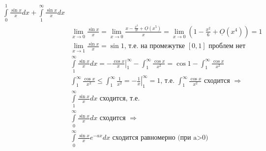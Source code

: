 \documentclass[a4paper, 12pt]{article}
\begin{document}
\begin{enumerate}
\begin{align*}
 \int\limits_0^1 \frac{\sin x}{x}dx + \int\limits_1^\infty \frac{\sin x}{x}dx \\
 &\lim_{x\to0}\frac{\sin x}{x} = \lim_{x\to0}\frac{x-\frac{x^3}{3!}+\underline{O}(x^5)}{x} = \lim_{x\to0}(1-\frac{x^2}{6}+\underline{O}(x^4)) = 1 \\
 &\lim_{x\to1}\frac{\sin x}{x} = \sin 1 \text{, т.е. на промежутке $[0,1]$ проблем нет} \\
 &\int\limits_1^\infty \frac{\sin x}{x}dx = 
 \left.-\frac{\cos x}{x}\right|_1^\infty - \int_1^\infty \frac{\cos x}{x^2} = 
 \cos 1 - \int_1^\infty \frac{\cos x}{x^2} \\
 &\int_1^\infty \frac{\cos x}{x^2} \leq \int_1^\infty \frac{1}{x^2} = 
 \left.-\frac{1}{x}\right|_1^\infty = 1 \text{, т.е. }
 \int_1^\infty \frac{\cos x}{x^2} \text{ сходится }\Rightarrow \\
 &\int\limits_1^\infty \frac{\sin x}{x}dx \text{ сходится, т.е. } \\
 &\int\limits_0^\infty \frac{\sin x}{x}dx \text{ сходится } \Rightarrow \\
 &\int\limits_0^\infty \frac{\sin x}{x}e^{-ax}dx \text{ сходится равномерно (при a>0)}
\end{align*}
\end{enumerate}
\end{document}
